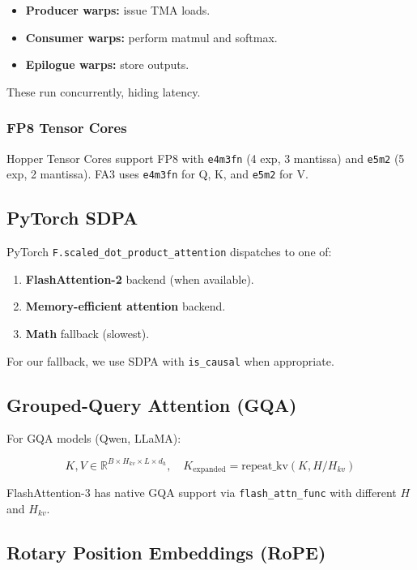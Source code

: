 \begin{itemize}
\item \textbf{Producer warps:} issue TMA loads.
\item \textbf{Consumer warps:} perform matmul and softmax.
\item \textbf{Epilogue warps:} store outputs.

\end{itemize}
These run concurrently, hiding latency.

\subsubsection{FP8 Tensor Cores}

Hopper Tensor Cores support FP8 with \texttt{e4m3fn} (4 exp, 3 mantissa) and 
\texttt{e5m2} (5 exp, 2 mantissa). FA3 uses \texttt{e4m3fn} for Q, K, and \texttt{e5m2} 
for V.

\subsection{PyTorch SDPA}

PyTorch \texttt{F.scaled\_dot\_product\_attention} dispatches to one of:

\begin{enumerate}
\item \textbf{FlashAttention-2} backend (when available).
\item \textbf{Memory-efficient attention} backend.
\item \textbf{Math} fallback (slowest).

\end{enumerate}
For our fallback, we use SDPA with \texttt{is\_causal} when appropriate.

\subsection{Grouped-Query Attention (GQA)}

For GQA models (Qwen, LLaMA):

\[
K, V \in \mathbb{R}^{B \times H_{kv} \times L \times d_h}, \quad
K_\text{expanded} = \text{repeat\_kv}(K, H / H_{kv})
\tag{3.6}
\]

FlashAttention-3 has native GQA support via \texttt{flash\_attn\_func} with different 
$H$ and $H_{kv}$.

\subsection{Rotary Position Embeddings (RoPE)}

